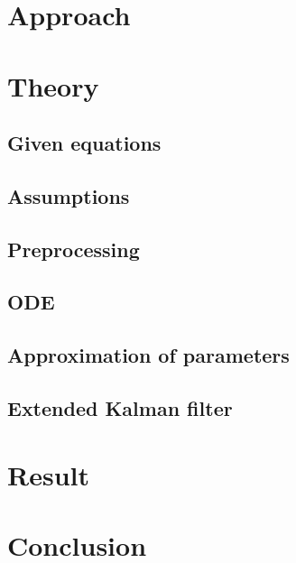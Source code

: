 \documentclass[12pt,a4paper]{article}
\begin{document}
\section{Approach}


\section{Theory}
\subsection{Given equations}


\subsection{Assumptions}


\subsection{Preprocessing}


\subsection{ODE}


\subsection{Approximation of parameters}


\subsection{Extended Kalman filter}


%

\section{Result}


\section{Conclusion}


{}

\end{document}
